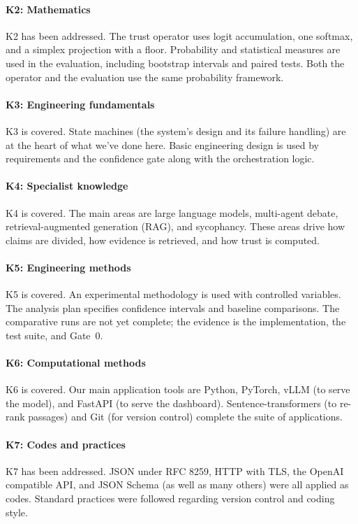 \paragraph{K2: Mathematics} K2 has been addressed. The trust operator uses logit accumulation, one softmax, and a simplex projection with a floor. Probability and statistical measures are used in the evaluation, including bootstrap intervals and paired tests. Both the operator and the evaluation use the same probability framework.

\paragraph{K3: Engineering fundamentals} K3 is covered. State machines (the system's design and its failure handling) are at the heart of what we've done here. Basic engineering design is used by requirements and the confidence gate along with the orchestration logic.

\paragraph{K4: Specialist knowledge} K4 is covered. The main areas are large language models, multi-agent debate, retrieval-augmented generation (RAG), and sycophancy. These areas drive how claims are divided, how evidence is retrieved, and how trust is computed.

\paragraph{K5: Engineering methods} K5 is covered. An experimental methodology is used with controlled variables. The analysis plan specifies confidence intervals and baseline comparisons. The comparative runs are not yet complete; the evidence is the implementation, the test suite, and Gate~0.

\paragraph{K6: Computational methods} K6 is covered. Our main application tools are Python, PyTorch, vLLM (to serve the model), and FastAPI (to serve the dashboard). Sentence-transformers (to re-rank passages) and Git (for version control) complete the suite of applications.

\paragraph{K7: Codes and practices} K7 has been addressed. JSON under RFC 8259, HTTP with TLS, the OpenAI compatible API, and JSON Schema (as well as many others) were all applied as codes. Standard practices were followed regarding version control and coding style.

